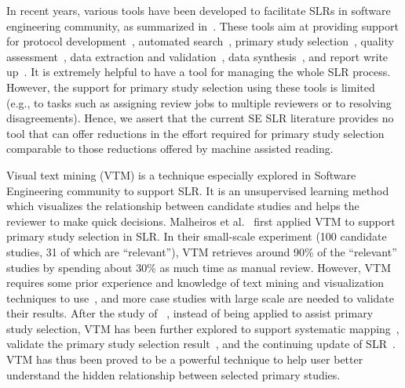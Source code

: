 \documentclass[final,twocolumn,5p]{elsarticle}
\theoremstyle{break}
\begin{document}
In recent years, various tools have been developed to facilitate SLRs in software engineering community, as summarized in~\cite{marshall2015tools,marshall2014tools,marshall2013tools}. These tools aim at providing support for protocol development~\cite{Molleri:2015:SWA:2745802.2745825,fernandez2010slr,hernandes2012using}, automated search~\cite{Molleri:2015:SWA:2745802.2745825,hernandes2012using}, primary study selection~\cite{Molleri:2015:SWA:2745802.2745825,hernandes2012using,fernandez2010slr,bowes2012slurp}, quality assessment~\cite{fernandez2010slr,bowes2012slurp,Molleri:2015:SWA:2745802.2745825}, data extraction and validation~\cite{Molleri:2015:SWA:2745802.2745825,hernandes2012using,fernandez2010slr,bowes2012slurp}, data synthesis~\cite{Molleri:2015:SWA:2745802.2745825,hernandes2012using,fernandez2010slr,bowes2012slurp},
and report write up~\cite{Molleri:2015:SWA:2745802.2745825,hernandes2012using,fernandez2010slr,bowes2012slurp}. It is extremely helpful to have a tool for managing the whole SLR process. However, the support for primary study selection using these tools is limited (e.g., to tasks such as assigning review jobs to multiple reviewers or to resolving disagreements).
Hence, we assert that the current SE SLR literature provides
no tool that can offer reductions in the effort required for primary study selection comparable to those reductions offered by machine assisted reading. 

Visual text mining (VTM) is a technique especially explored in Software Engineering community to support SLR. It is an unsupervised learning method which visualizes the relationship between candidate studies and helps the reviewer to make quick decisions. Malheiros et al.~\cite{malheiros2007visual} first applied VTM to support primary study selection in SLR. In their small-scale experiment (100 candidate studies, 31 of which are ``relevant''), VTM retrieves around 90\% of the ``relevant'' studies by spending about 30\% as much time as manual review. However, VTM requires some prior experience and knowledge of text mining and visualization techniques to use~\cite{bowes2012slurp}, and more case studies with large scale are needed to validate their results. After the study of ~\cite{malheiros2007visual}, instead of being applied to assist primary study selection, VTM has been further explored to support systematic mapping~\cite{felizardo2010approach}, validate the primary study selection result~\cite{felizardo2012visual}, and the continuing update of SLR~\cite{Felizardo:2014:VAA:2601248.2601252}. VTM has thus been proved to be a powerful technique to help user better understand the hidden relationship between selected primary studies.
\end{document}
